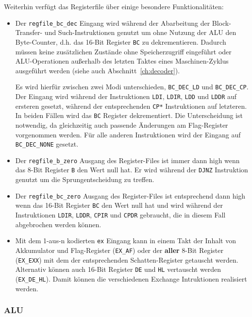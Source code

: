 \documentclass[ngerman, cd=lightcolor]{tudscrreprt}
\begin{document}
Weiterhin verfügt das Registerfile über einige besondere Funktionalitäten:

\begin{itemize}
\item
Der \texttt{regfile\_bc\_dec} Eingang wird während der Abarbeitung der
Block-Transfer- und Such-Instruktionen genutzt um ohne Nutzung der ALU den
Byte-Counter, d.h. das 16-Bit Register \texttt{BC} zu dekrementieren. Dadurch
müssen keine zusätzlichen Zustände ohne Speicherzugriff eingeführt oder
ALU-Operationen außerhalb des letzten Taktes eines Maschinen-Zyklus ausgeführt
werden (siehe auch Abschnitt~\ref{ch:decoder}).

Es wird hierfür zwischen zwei Modi unterschieden, \texttt{BC\_DEC\_LD} und
\texttt{BC\_DEC\_CP}. Der Eingang wird während der Instruktionen \texttt{LDI},
\texttt{LDIR}, \texttt{LDD} und \texttt{LDDR} auf ersteren gesetzt, während der
entsprechenden \texttt{CP*} Instruktionen auf letzteren. In beiden Fällen wird
das \texttt{BC} Register dekrementiert. Die Unterscheidung ist notwendig, da
gleichzeitig auch passende Änderungen am Flag-Register vorgenommen werden. Für
alle anderen Instruktionen wird der Eingang auf \texttt{BC\_DEC\_NONE} gesetzt.

\clearpage
\item
Der \texttt{regfile\_b\_zero} Ausgang des Register-Files ist immer dann
high wenn das 8-Bit Register \texttt{B} den Wert null hat. Er wird während der
\texttt{DJNZ} Instruktion genutzt um die Sprungentscheidung zu treffen.

\item
Der \texttt{regfile\_bc\_zero}  Ausgang des Register-Files ist
entsprechend dann high wenn das 16-Bit Register \texttt{BC} den Wert null hat
und wird während der Instruktionen \texttt{LDIR}, \texttt{LDDR}, \texttt{CPIR}
und \texttt{CPDR} gebraucht, die in diesem Fall abgebrochen werden können.

\item
Mit dem 1-aus-n kodierten \texttt{ex} Eingang kann in einem Takt der Inhalt von
Akkumulator und Flag-Register (\texttt{EX\_AF}) oder der \textbf{aller} 8-Bit
Register (\texttt{EX\_EXX}) mit dem der entsprechenden Schatten-Register
getauscht werden. Alternativ können auch 16-Bit Register \texttt{DE} und
\texttt{HL} vertauscht werden (\texttt{EX\_DE\_HL}). Damit können die
verschiedenen Exchange Intruktionen realisiert werden.
\end{itemize}

\subsubsection{ALU}
\end{document}
